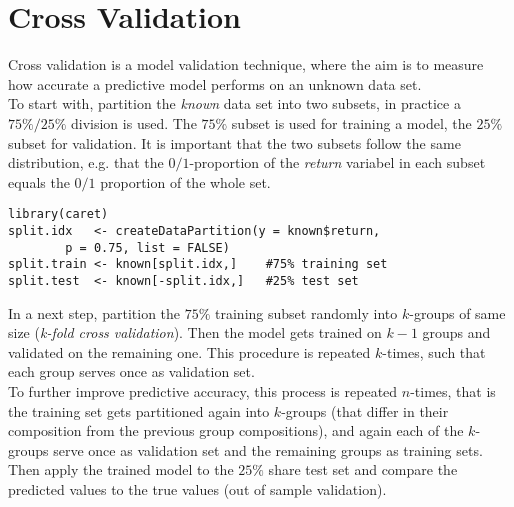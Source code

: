 \documentclass[10pt,a4paper]{article}
\begin{document}
\section{Cross Validation}

Cross validation is a model validation technique, where the aim is to measure how accurate a predictive model performs on an unknown data set. \\

To start with, partition the \textit{known} data set into two subsets, in practice a $75\%/25\%$ division is used. The $75\%$ subset is used for training a model, the $25\%$ subset for validation. It is important that the two subsets follow the same distribution, e.g. that the $0/1$-proportion of the \textit{return} variabel in each subset equals the $0/1$ proportion of the whole set. \\

\begin{lstlisting}
library(caret)
split.idx   <- createDataPartition(y = known$return, 
		p = 0.75, list = FALSE) 	
split.train <- known[split.idx,]	#75% training set
split.test  <- known[-split.idx,]	#25% test set
\end{lstlisting}

In a next step, partition the $75\%$ training subset randomly into $k$-groups of same size (\textit{k-fold cross validation}). Then the model gets trained on $k-1$ groups and validated on the remaining one. This procedure is repeated $k$-times, such that each group serves once as validation set. \\

To further improve predictive accuracy, this process is repeated $n$-times, that is the training set gets  partitioned again into $k$-groups (that differ in their composition from the previous group compositions), and again each of the $k$-groups serve once as validation set and the remaining groups as training sets.  \\

Then apply the trained model to the $25\%$ share test set and compare the predicted values to the true values (out of sample validation).
\end{document}
